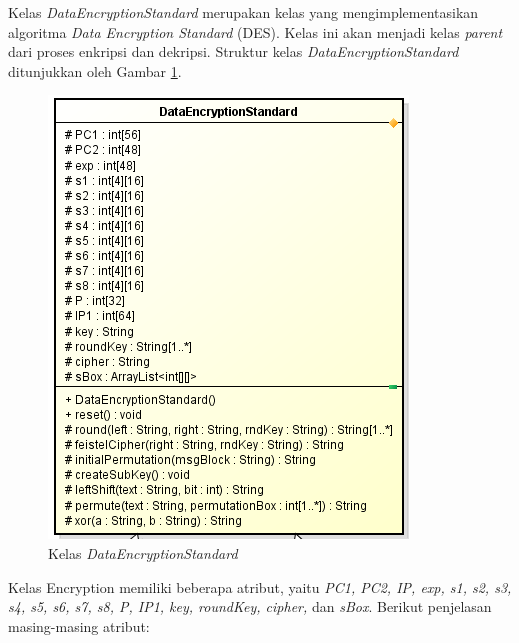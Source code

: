 Kelas \textit{DataEncryptionStandard} merupakan kelas yang mengimplementasikan algoritma \textit{Data Encryption Standard} (DES). Kelas ini akan menjadi kelas \textit{parent} dari proses enkripsi dan dekripsi. Struktur kelas \textit{DataEncryptionStandard} ditunjukkan oleh Gambar \ref{fig:classdes}.

\begin{figure}[H]
	\centering
	\includegraphics[scale=0.6]{Gambar/class_des}
	\caption{Kelas \textit{DataEncryptionStandard}}\label{fig:classdes}
\end{figure}

Kelas Encryption memiliki beberapa atribut, yaitu \textit{PC1, PC2, IP, exp, s1, s2, s3, s4, s5, s6, s7, s8, P, IP1, key, roundKey, cipher,} dan \textit{sBox}. Berikut penjelasan masing-masing atribut:

